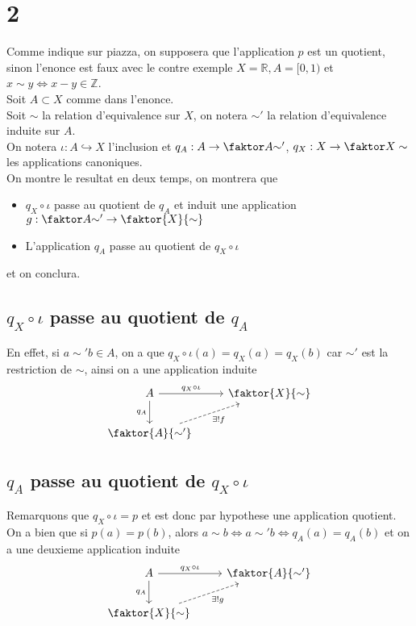 \documentclass[11pt, a4paper]{article}
\begin{document}
\section*{2}
Comme indique sur piazza, on supposera que l'application $p$ est un quotient, sinon l'enonce est faux avec le contre exemple $ X = \mathbb{R}, A = [ 0,1) $ et $x\sim y \iff x-y \in \mathbb{Z}$.\\

Soit $A \subset X$ comme dans l'enonce.\\
Soit $\sim$ la relation d'equivalence sur $X$, on notera $\sim'$ la relation d'equivalence induite sur $A$.\\
On notera $\iota: A \hookrightarrow X$ l'inclusion et  $q_A: A \to \faktor A { \sim' }$, $q_X: X \to \faktor X \sim$ les applications canoniques.\\
On montre le resultat en deux temps, on montrera que
\begin{itemize}
\item $q_X\circ \iota$ passe au quotient de $q_A$ et induit une application $g: \faktor A { \sim' }\to \faktor { X} { \sim} $
\item L'application $q_A$ passe au quotient de $q_X\circ \iota$ 
\end{itemize}
et on conclura.
\subsection*{ $q_X \circ\iota$ passe au quotient de $q_A$ }
En effet, si $ a\sim' b\in A$, on a que $ q_X\circ \iota( a) = q_X( a) = q_X( b)  $ car $\sim'$ est la restriction de $\sim$, ainsi on a une application induite
\[\begin{tikzcd}
	A & {\faktor {X} {\sim}} \\
	{\faktor {A} {\sim'}}
	\arrow["{q_A}"', from=1-1, to=2-1]
	\arrow["{q_X\circ\iota}", from=1-1, to=1-2]
	\arrow["{\exists ! f}"', dashed, from=2-1, to=1-2]
\end{tikzcd}\]
\subsection*{ $q_A$ passe au quotient de $q_X\circ \iota$ }
Remarquons que $q_X \circ \iota= p$ et est donc par hypothese une application quotient.\\

On a bien que si $p ( a) = p( b) $, alors $a\sim b \iff a\sim' b \iff q_A( a) = q_A( b) $ et on a une deuxieme application induite 
\[\begin{tikzcd}
	A & { \faktor {A} {\sim'}} \\
	{\faktor {X} {\sim}}
	\arrow["{q_A}"', from=1-1, to=2-1]
	\arrow["{q_X\circ\iota}", from=1-1, to=1-2]
	\arrow["{\exists ! g}"', dashed, from=2-1, to=1-2]
\end{tikzcd}\]
\end{document}
